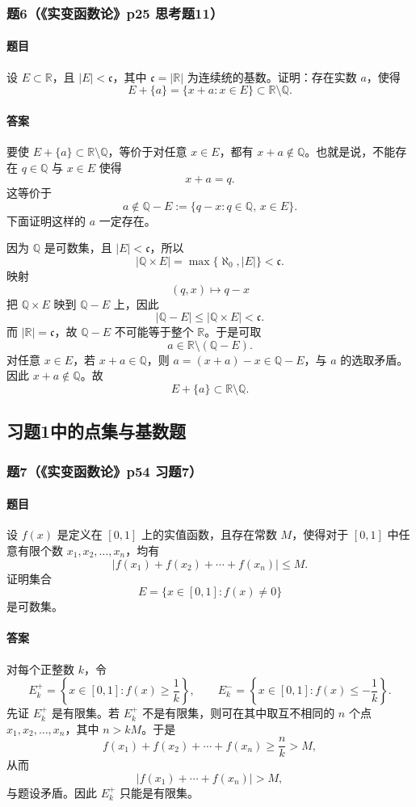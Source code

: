 \documentclass{article}
\newcommand{\R}{\mathbb{R}}
\newcommand{\Q}{\mathbb{Q}}
\begin{document}
	\subsubsection*{题6（《实变函数论》p25 思考题11）}
	\paragraph{题目}设 $E\subset\R$，且 $|E|<\mathfrak c$，其中 $\mathfrak c=|\R|$ 为连续统的基数。证明：存在实数 $a$，使得
	\[
	E+\{a\}=\{x+a:x\in E\}\subset \R\setminus\Q .
	\]
	
	\paragraph{答案}要使 $E+\{a\}\subset \R\setminus\Q$，等价于对任意 $x\in E$，都有 $x+a\notin\Q$。也就是说，不能存在 $q\in\Q$ 与 $x\in E$ 使得
	\[
	x+a=q.
	\]
	这等价于
	\[
	a\notin \Q-E:=\{q-x:q\in\Q,\,x\in E\}.
	\]
	下面证明这样的 $a$ 一定存在。
	
	因为 $\Q$ 是可数集，且 $|E|<\mathfrak c$，所以
	\[
	|\Q\times E|=\max\{\aleph_0,|E|\}<\mathfrak c.
	\]
	映射
	\[
	(q,x)\longmapsto q-x
	\]
	把 $\Q\times E$ 映到 $\Q-E$ 上，因此
	\[
	|\Q-E|\le |\Q\times E|<\mathfrak c.
	\]
	而 $|\R|=\mathfrak c$，故 $\Q-E$ 不可能等于整个 $\R$。于是可取
	\[
	a\in\R\setminus(\Q-E).
	\]
	对任意 $x\in E$，若 $x+a\in\Q$，则 $a=(x+a)-x\in\Q-E$，与 $a$ 的选取矛盾。因此 $x+a\notin\Q$。故
	\[
	E+\{a\}\subset \R\setminus\Q.
	\]
	
	\subsection{习题1中的点集与基数题}
	
	\subsubsection*{题7（《实变函数论》p54 习题7）}
	\paragraph{题目}设 $f(x)$ 是定义在 $[0,1]$ 上的实值函数，且存在常数 $M$，使得对于 $[0,1]$ 中任意有限个数 $x_1,x_2,\ldots,x_n$，均有
	\[
	\bigl|f(x_1)+f(x_2)+\cdots+f(x_n)\bigr|\le M.
	\]
	证明集合
	\[
	E=\{x\in[0,1]:f(x)\ne0\}
	\]
	是可数集。
	
	\paragraph{答案}对每个正整数 $k$，令
	\[
	E_k^+=\left\{x\in[0,1]:f(x)\ge \frac1k\right\},\qquad
	E_k^- =\left\{x\in[0,1]:f(x)\le -\frac1k\right\}.
	\]
	先证 $E_k^+$ 是有限集。若 $E_k^+$ 不是有限集，则可在其中取互不相同的 $n$ 个点 $x_1,x_2,\ldots,x_n$，其中 $n>kM$。于是
	\[
	f(x_1)+f(x_2)+\cdots+f(x_n)\ge \frac{n}{k}>M,
	\]
	从而
	\[
	\bigl|f(x_1)+\cdots+f(x_n)\bigr|>M,
	\]
	与题设矛盾。因此 $E_k^+$ 只能是有限集。
	
\end{document}
